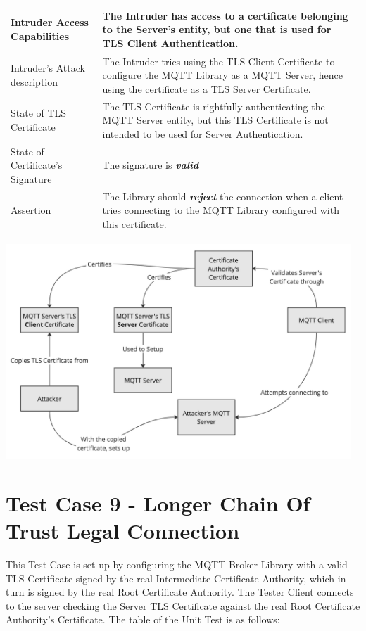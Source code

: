 \documentclass[binding=0.6cm,noexaminfo]{sapthesis}
\begin{document}
\begin{center}
\begin{tabular}{| p{6cm} | p{6cm} |}
\hline
Intruder Access Capabilities & The Intruder has access to a certificate belonging to the Server’s entity, but one that is used for TLS Client Authentication. \\
\hline
Intruder’s Attack description & The Intruder tries using the TLS Client Certificate to configure the MQTT Library as a MQTT Server, hence using the certificate as a TLS Server Certificate. \\
\hline
State of TLS Certificate & The TLS Certificate is rightfully authenticating the MQTT Server entity, but this TLS Certificate is not intended to be used for Server Authentication. \\
\hline
State of Certificate’s Signature & The signature is \textbf{\textit{valid}} \\
\hline
Assertion & The Library should \textbf{\textit{reject}} the connection when a client tries connecting to the MQTT Library configured with this certificate. \\
\hline
\end{tabular}
\end{center}

\includegraphics[width=13cm]{TC8}

\section{Test Case 9 - Longer Chain Of Trust Legal Connection}
This Test Case is set up by configuring the MQTT Broker Library with a valid TLS Certificate signed by the real Intermediate Certificate Authority, which in turn is signed by the real Root Certificate Authority. The Tester Client connects to the server checking the Server TLS Certificate against the real Root Certificate Authority’s Certificate. The table of the Unit Test is as follows:
\end{document}
